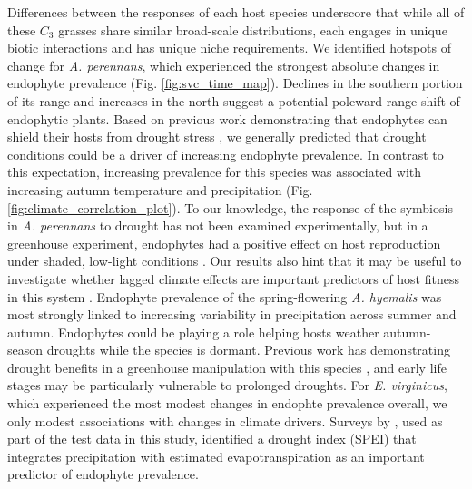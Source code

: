 \documentclass[11pt]{article}
\let\cite\citep
\begin{document}
Differences between the responses of each host species underscore that while all of these $C_3$ grasses share similar broad-scale distributions, each engages in unique biotic interactions and has unique niche requirements.
We identified hotspots of change for \emph{A. perennans}, which experienced the strongest absolute changes in endophyte prevalence (Fig. \ref{fig:svc_time_map}).
Declines in the southern portion of its range and increases in the north suggest a potential poleward range shift of endophytic plants. 
Based on previous work demonstrating that endophytes can shield their hosts from drought stress \cite{decunta2021systematic}, we generally predicted that drought conditions could be a driver of increasing endophyte prevalence. 
In contrast to this expectation, increasing prevalence for this species was associated with increasing autumn temperature and precipitation (Fig. \ref{fig:climate_correlation_plot}). 
To our knowledge, the response of the symbiosis in \emph{A. perennans} to drought has not been examined experimentally, but in a greenhouse experiment, endophytes had a positive effect on host reproduction under shaded, low-light conditions \citep{davitt2010costs}. 
Our results also hint that it may be useful to investigate whether lagged climate effects are important predictors of host fitness in this system \cite{evers2021lagged}.
Endophyte prevalence of the spring-flowering \emph{A. hyemalis} was most strongly linked to increasing variability in precipitation across summer and autumn.  
Endophytes could be playing a role helping hosts weather autumn-season droughts while the species is dormant.
Previous work has demonstrating drought benefits in a greenhouse manipulation with this species \citep{davitt2011understanding}, and early life stages may be particularly vulnerable to prolonged droughts.
For \emph{E. virginicus}, which experienced the most modest changes in endophte prevalence overall, we only modest associations with changes in climate drivers. 
Surveys by \citet{sneck2017variation}, used as part of the test data in this study, identified a drought index (SPEI) that integrates precipitation with estimated evapotranspiration as an important predictor of endophyte prevalence.
\end{document}
